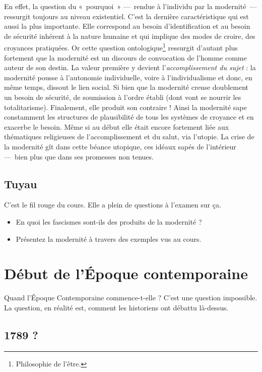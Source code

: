 \documentclass[12pt]{report}
\begin{document}
En effet, la question du «~pourquoi~» ---~rendue à l’individu par la modernité~--- ressurgit toujours au niveau existentiel. C'est la dernière caractéristique qui est aussi la plus importante. Elle correspond au besoin d’identification et au besoin de sécurité inhérent à la nature humaine et qui implique des modes de croire, des croyances pratiquées. Or cette question ontologique\footnote{Philosophie de l'être.} ressurgit d’autant plus fortement que la modernité est un discours de convocation de l’homme comme auteur de son destin. La valeur première y devient l’\emph{accomplissement du sujet} : la modernité pousse à l’autonomie individuelle, voire à l’individualisme et donc, en même temps, dissout le lien social. Si bien que la modernité creuse doublement un besoin de sécurité, de soumission à l'ordre établi (dont vont se nourrir les totalitarisme). Finalement, elle produit son contraire !
Ainsi la modernité sape constamment les structures de plausibilité de tous les systèmes de croyance et en exacerbe le besoin. Même si au début elle était encore fortement liée aux thématiques religieuses de l’accomplissement et du salut, via l’utopie. La crise de la modernité gît dans cette béance utopique, ces idéaux sapés de l’intérieur ---~bien plus que dans ses promesses non tenues.

\subsection*{Tuyau}

C'est le fil rouge du cours. Elle a plein de questions à l'examen sur ça.

\begin{itemize}
	\item En quoi les fascismes sont-ils des produits de la modernité ?
	\item Présentez la modernité à travers des exemples vus au cours.
\end{itemize}

\section*{Début de l'Époque contemporaine}

Quand l'Époque Contemporaine commence-t-elle ? C'est une question impossible. La question, en réalité est, comment les historiens ont débattu là-dessus.

\subsection*{1789 ?}
\end{document}
